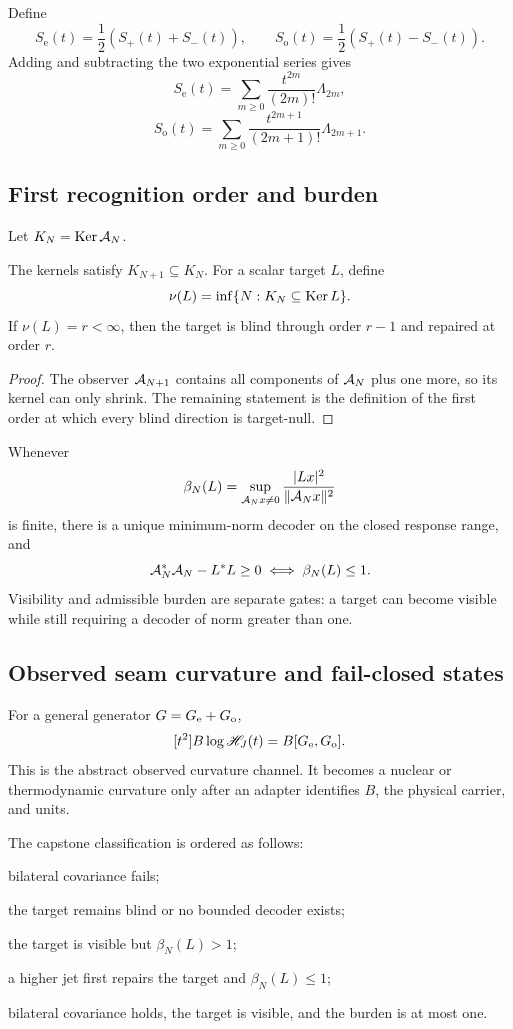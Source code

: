 Define
\[
 S_{\mathrm e}(t)=\frac12(S_+(t)+S_-(t)),
 \qquad
 S_{\mathrm o}(t)=\frac12(S_+(t)-S_-(t)).
\]
Adding and subtracting the two exponential series gives
\[
 S_{\mathrm e}(t)=\sum_{m\ge0}\frac{t^{2m}}{(2m)!}\Lambda_{2m},
\]
\[
 S_{\mathrm o}(t)=\sum_{m\ge0}\frac{t^{2m+1}}{(2m+1)!}\Lambda_{2m+1}.
\]

\subsection{First recognition order and burden}

Let $K_N=\operatorname{Ker}\mathcal A_N$.

\begin{theorem}
The kernels satisfy $K_{N+1}\subseteq K_N$. For a scalar target $L$, define
\[
 \nu(L)=\inf\{N:K_N\subseteq\operatorname{Ker} L\}.
\]
If $\nu(L)=r<\infty$, then the target is blind through order $r-1$ and repaired at order $r$.
\end{theorem}

\begin{proof}
The observer $\mathcal A_{N+1}$ contains all components of $\mathcal A_N$ plus one more, so its kernel can only shrink. The remaining statement is the definition of the first order at which every blind direction is target-null.
\end{proof}

Whenever
\[
 \beta_N(L)=\sup_{\mathcal A_Nx\ne0}\frac{|Lx|^2}{\|\mathcal A_Nx\|^2}
\]
is finite, there is a unique minimum-norm decoder on the closed response range, and
\[
 \mathcal A_N^*\mathcal A_N-L^*L\ge0
 \iff \beta_N(L)\le1.
\]
Visibility and admissible burden are separate gates: a target can become visible while still requiring a decoder of norm greater than one.

\subsection{Observed seam curvature and fail-closed states}

For a general generator $G=G_{\mathrm e}+G_{\mathrm o}$,
\[
 [t^2]B\log\mathscr H_J(t)=B[G_{\mathrm e},G_{\mathrm o}].
\]
This is the abstract observed curvature channel. It becomes a nuclear or thermodynamic curvature only after an adapter identifies $B$, the physical carrier, and units.

The capstone classification is ordered as follows:
\begin{description}[leftmargin=3.2em,style=nextline]
\item[OPEN\_SEAM] bilateral covariance fails;
\item[ABSTAIN] the target remains blind or no bounded decoder exists;
\item[BURDEN\_EXCEEDS\_ONE] the target is visible but $\beta_N(L)>1$;
\item[HIGHER\_LAYER\_REPAIR] a higher jet first repairs the target and $\beta_N(L)\le1$;
\item[CLOSED] bilateral covariance holds, the target is visible, and the burden is at most one.
\end{description}

